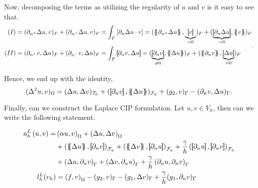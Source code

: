 Now, decomposing the terms as utilizing the regularity of $u$ and $v$ is it easy to see that.    \[
\begin{split}
    (I) & = ( \partial _{n^{+}} \Delta u, v)_{ F} + ( \partial _{n^{-}} \Delta u, v)_{ F}  = \int_{F}^{} \left[ \partial _{n} \Delta u \cdot  v \right] =  (  \mean{ \partial _{n^{+}} \Delta u } , \underbrace{\jump{v  }}_{ = 0}      )_{ F} + (  \underbrace{\jump{ \partial _{n}
    \Delta u }}_{=0}  , \mean{v  }     )_{ F} \\
    (II) &=  ( \partial _{n^{+}} v, \Delta u) _{F} + ( \partial _{n^{-}} v, \Delta u) _{F} = \int_{F}^{} \jump{ \partial _{n} v, \Delta u } =  ( \underbrace{\jump{ \partial _{n} v}}_{ \neq 0 } , \mean{ \Delta u })_{F}  + ( \mean{ \partial _{n} v}, \underbrace{\jump{ \Delta u
    }}_{=0} )_{F}
\end{split} .
\]

Hence, we end up with the identity,
\[
( \Delta ^2 u, v ) _{\Omega } = ( \Delta u, \Delta v)_{\mathcal{T} _{h} }  +  ( \jump{ \partial _{n} v} , \mean{ \Delta u })_{\mathcal{F}_{h} }  + ( g_{2} , v )_{\Gamma } - ( \partial _{n} v, \Delta u)_{\Gamma }.
\]

Finally, can we construct the Laplace CIP formulation. Let $u,v \in V_{h}$, then can we write the following statement.

\begin{equation}
    \begin{split}
        a_{h}^{L} \left( u, v \right)   =&
        \left( \alpha  u, v \right) _{\Omega }   +  \left( \Delta  u, \Delta v \right) _{ \Omega } \\
                                         & + \left( \mean{  \Delta  u }, \jump{ \partial _{n }v} \right)_{\mathcal{F}_{h}  }  + \left( \mean{ \Delta  v }, \jump{ \partial _{n}u }      \right)_{\mathcal{F}_{h}  }  + \frac{\gamma }{h}  \left( \jump{ \partial _{n} u}, \jump{ \partial _{n} v   }   \right)_{\mathcal{F}_{h} } \\
                                         & + \left(   \Delta  u ,  \partial _{n }v \right)_{\Gamma   }  + \left(  \Delta  v ,  \partial _{n}u       \right)_{\Gamma  }  + \frac{\gamma }{h}  \left(  \partial _{n} u,  \partial _{n} v      \right)_{ \Gamma } \\
        l^{L}_{h}( v_{h}) & =  \left( f, v \right) _{\Omega } - ( g_{2},  v )_{\Gamma } -  ( g_{1}, \Delta  v  )_{\Gamma }  + \frac{\gamma }{h} ( g_{1}, \partial _{n} v  )_{\Gamma }
    \end{split}
\end{equation}


